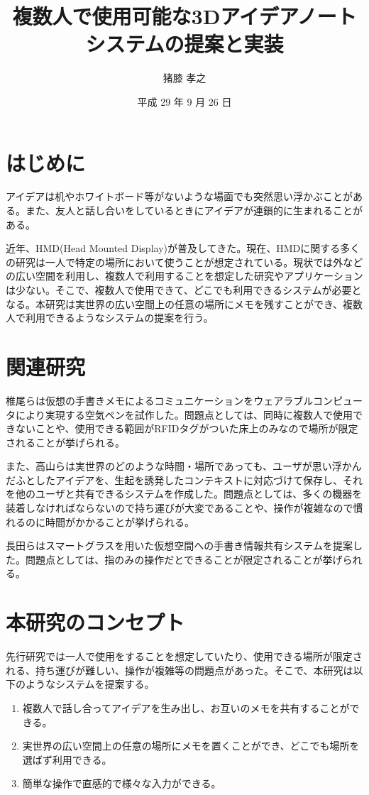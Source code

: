 \documentclass[twocolumn, a4paper]{UECIEresume}
\title{複数人で使用可能な3Dアイデアノートシステムの提案と実装}
\date{平成 29 年 9 月 26 日}
\affiliation{情報学専攻 メディア情報学プログラム}
\author{猪膝 孝之}
\begin{document}
\maketitle

\section{はじめに}
アイデアは机やホワイトボード等がないような場面でも突然思い浮かぶことがある。また、友人と話し合いをしているときにアイデアが連鎖的に生まれることがある。

近年、HMD(Head Mounted Display)が普及してきた。現在、HMDに関する多くの研究は一人で特定の場所において使うことが想定されている。現状では外などの広い空間を利用し、複数人で利用することを想定した研究やアプリケーションは少ない。そこで、複数人で使用できて、どこでも利用できるシステムが必要となる。本研究は実世界の広い空間上の任意の場所にメモを残すことができ、複数人で利用できるようなシステムの提案を行う。

\section{関連研究}
椎尾ら\cite{tex1,tex2}は仮想の手書きメモによるコミュニケーションをウェアラブルコンピュータにより実現する空気ペンを試作した。問題点としては、同時に複数人で使用できないことや、使用できる範囲がRFIDタグがついた床上のみなので場所が限定されることが挙げられる。

また、高山ら\cite{tex3,tex4}は実世界のどのような時間・場所であっても、ユーザが思い浮かんだふとしたアイデアを、生起を誘発したコンテキストに対応づけて保存し、それを他のユーザと共有できるシステムを作成した。問題点としては、多くの機器を装着しなければならないので持ち運びが大変であることや、操作が複雑なので慣れるのに時間がかかることが挙げられる。

長田ら\cite{tex5}はスマートグラスを用いた仮想空間への手書き情報共有システムを提案した。問題点としては、指のみの操作だとできることが限定されることが挙げられる。


\section{本研究のコンセプト}
先行研究では一人で使用をすることを想定していたり、使用できる場所が限定される、持ち運びが難しい、操作が複雑等の問題点があった。そこで、本研究は以下のようなシステムを提案する。
\begin{enumerate}[(1)]
 \item 複数人で話し合ってアイデアを生み出し、お互いのメモを共有することができる。
 \item 実世界の広い空間上の任意の場所にメモを置くことができ、どこでも場所を選ばず利用できる。
 \item 簡単な操作で直感的で様々な入力ができる。
\end{enumerate}
\end{document}
